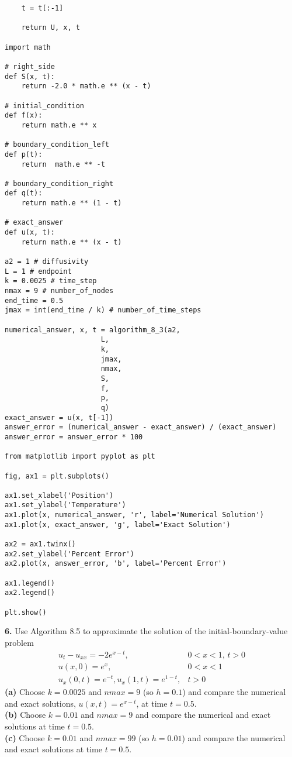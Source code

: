 \documentclass{amsbook}%
\theoremstyle{plain}
\numberwithin{equation}{section}
\begin{document}
\begin{small}
\begin{verbatim}
    t = t[:-1]
            
    return U, x, t

import math

# right_side
def S(x, t):
    return -2.0 * math.e ** (x - t)

# initial_condition
def f(x):
    return math.e ** x

# boundary_condition_left
def p(t):
    return  math.e ** -t

# boundary_condition_right
def q(t):
    return math.e ** (1 - t)

# exact_answer	
def u(x, t):
	return math.e ** (x - t)

a2 = 1 # diffusivity
L = 1 # endpoint
k = 0.0025 # time_step
nmax = 9 # number_of_nodes
end_time = 0.5
jmax = int(end_time / k) # number_of_time_steps

numerical_answer, x, t = algorithm_8_3(a2,
                       L,
                       k,
                       jmax,
                       nmax,
                       S,
                       f,
                       p,
                       q)
exact_answer = u(x, t[-1])
answer_error = (numerical_answer - exact_answer) / (exact_answer)
answer_error = answer_error * 100

from matplotlib import pyplot as plt

fig, ax1 = plt.subplots()

ax1.set_xlabel('Position')
ax1.set_ylabel('Temperature')
ax1.plot(x, numerical_answer, 'r', label='Numerical Solution')
ax1.plot(x, exact_answer, 'g', label='Exact Solution')

ax2 = ax1.twinx()
ax2.set_ylabel('Percent Error')
ax2.plot(x, answer_error, 'b', label='Percent Error')

ax1.legend()
ax2.legend()

plt.show()
\end{verbatim}
\end{small}

		\noindent\textbf{6.} Use Algorithm 8.5 to approximate the solution of the initial-boundary-value problem 
		\begin{align}
			u_t-u_{xx}=-2e^{x-t}, & 0<x<1,\, t>0\\
			u(x,0)=e^x, & 0<x<1\\
			u_x(0,t)=e^{-t}, u_x(1,t)=e^{1-t}, & t>0
		\end{align}
		\textbf{(a)} Choose $k=0.0025$ and $nmax=9$ (so $h=0.1$) and compare the numerical and exact solutions, $u(x,t)=e^{x-t}$, at time $t=0.5$.\\
		\textbf{(b)} Choose $k=0.01$ and $nmax=9$ and compare the numerical and exact solutions at time $t=0.5$.\\
		\textbf{(c)} Choose $k=0.01$ and $nmax=99$ (so $h=0.01$) and compare the numerical and exact solutions at time $t=0.5$.
		\\[12pt]
		
\end{document}
